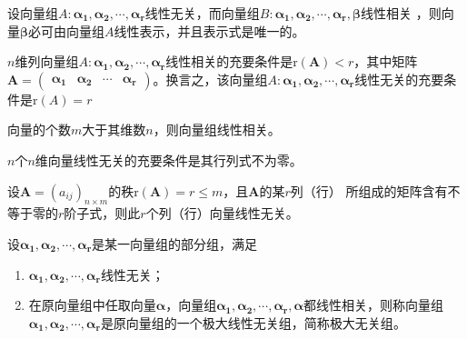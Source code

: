 \begin{theorem}
    设向量组$A:\boldsymbol{\alpha_1},\boldsymbol{\alpha_2},\cdots,\boldsymbol{\alpha_r}$线性无关，而向量组$B:\boldsymbol{\alpha_1},\boldsymbol{\alpha_2},\cdots,\boldsymbol{\alpha_r},\boldsymbol{\beta}$线性相关
    ，则向量$\boldsymbol{\beta}$必可由向量组$A$线性表示，并且表示式是唯一的。
\end{theorem}

\begin{theorem}
    $n$维列向量组$A:\boldsymbol{\alpha_1},\boldsymbol{\alpha_2},\cdots,\boldsymbol{\alpha_r}$线性相关的充要条件是$\mathrm{r}(\boldsymbol{A})<r$，其中矩阵
    $\boldsymbol{A}=\left(\begin{array}{cccc}
        \boldsymbol{\alpha_1} & \boldsymbol{\alpha_2} & \cdots & \boldsymbol{\alpha_r} 
    \end{array}\right)$。换言之，该向量组$A:\boldsymbol{\alpha_1},\boldsymbol{\alpha_2},\cdots,\boldsymbol{\alpha_r}$线性无关的充要条件是$\mathrm{r}(A)=r$
\end{theorem}

\begin{theorem}
    向量的个数$m$大于其维数$n$，则向量组线性相关。
\end{theorem}

\begin{theorem}
    $n$个$n$维向量线性无关的充要条件是其行列式不为零。
\end{theorem}

\begin{theorem}
    设$\boldsymbol{A}=(a_{ij})_{n\times m}$的秩$\mathrm{r}(\boldsymbol{A})=r\leq m$，且$\boldsymbol{A}$的某$r$列（行）
    所组成的矩阵含有不等于零的$r$阶子式，则此$r$个列（行）向量线性无关。
\end{theorem}

\begin{definition}[极大无关组]
    设$\boldsymbol{\alpha_1},\boldsymbol{\alpha_2},\cdots,\boldsymbol{\alpha_r}$是某一向量组的部分组，满足
    \begin{enumerate}[(1)]
        \item $\boldsymbol{\alpha_1},\boldsymbol{\alpha_2},\cdots,\boldsymbol{\alpha_r}$线性无关；
        \item 在原向量组中任取向量$\boldsymbol{\alpha}$，向量组$\boldsymbol{\alpha_1},\boldsymbol{\alpha_2},\cdots,\boldsymbol{\alpha_r},\boldsymbol{\alpha}$都线性相关，则称向量组
        $\boldsymbol{\alpha_1},\boldsymbol{\alpha_2},\cdots,\boldsymbol{\alpha_r}$是原向量组的一个极大线性无关组，简称{\heiti 极大无关组}。
    \end{enumerate}
\end{definition}

